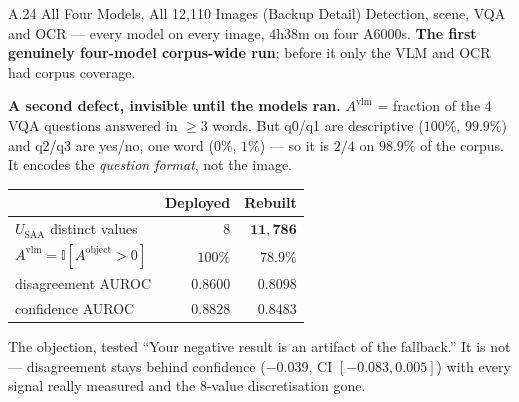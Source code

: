 \documentclass[aspectratio=169,11pt]{beamer}
\begin{document}
\begin{frame}{A.24 All Four Models, All 12,110 Images (Backup Detail)}
\scriptsize
Detection, scene, VQA and OCR --- every model on every image, $4$h$38$m on four A6000s. \textbf{The first genuinely four-model corpus-wide run}; before it only the VLM and OCR had corpus coverage.
\vspace{1mm}

\textbf{A second defect, invisible until the models ran.} $A^{\text{vlm}}$ = fraction of the 4 VQA questions answered in $\ge3$ words. But q0/q1 are descriptive ($100\%$, $99.9\%$) and q2/q3 are yes/no, one word ($0\%$, $1\%$) --- so it is $2/4$ on $\mathbf{98.9\%}$ of the corpus. It encodes the \emph{question format}, not the image.
\vspace{1mm}
\begin{center}\footnotesize
\begin{tabular}{@{}l r r@{}}
\toprule
& \textbf{Deployed} & \textbf{Rebuilt} \\
\midrule
$U_{\text{SAA}}$ distinct values & $8$ & $\mathbf{11{,}786}$ \\
$A^{\text{vlm}}=\mathbb{I}[A^{\text{object}}{>}0]$ & $100\%$ & $78.9\%$ \\
disagreement AUROC & $0.8600$ & $0.8098$ \\
confidence AUROC & $0.8828$ & $\mathbf{0.8483}$ \\
\bottomrule
\end{tabular}
\end{center}
\vspace{-1mm}
\begin{alertblock}{\scriptsize The objection, tested}
\scriptsize ``Your negative result is an artifact of the fallback.'' It is not --- disagreement stays behind confidence ($-0.039$, CI $[-0.083,0.005]$) with every signal really measured and the 8-value discretisation gone.
\end{alertblock}
\end{frame}
\end{document}
